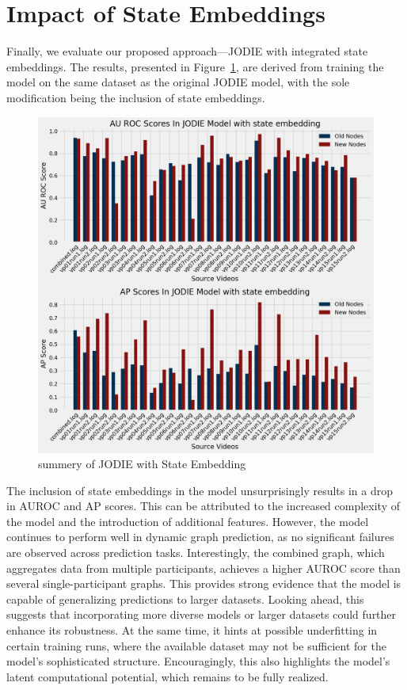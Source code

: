 \section{Impact of State Embeddings}
Finally, we evaluate our proposed approach—JODIE with integrated state embeddings. The results, presented in Figure~\ref{fig:JODIE_state_embedding_results}, are derived from training the model on the same dataset as the original JODIE model, with the sole modification being the inclusion of state embeddings.
\begin{figure}[h]
    \centering
    \includegraphics[width=\textwidth]{figures/05_JODIE_with_state.png}
    \caption{summery of JODIE with State Embedding}
    \label{fig:JODIE_state_embedding_results}
\end{figure}




The inclusion of state embeddings in the model unsurprisingly results in a drop in AUROC and AP scores. This can be attributed to the increased complexity of the model and the introduction of additional features. However, the model continues to perform well in dynamic graph prediction, as no significant failures are observed across prediction tasks. Interestingly, the combined graph, which aggregates data from multiple participants, achieves a higher AUROC score than several single-participant graphs. This provides strong evidence that the model is capable of generalizing predictions to larger datasets. Looking ahead, this suggests that incorporating more diverse models or larger datasets could further enhance its robustness. At the same time, it hints at possible underfitting in certain training runs, where the available dataset may not be sufficient for the model’s sophisticated structure. Encouragingly, this also highlights the model’s latent computational potential, which remains to be fully realized.

